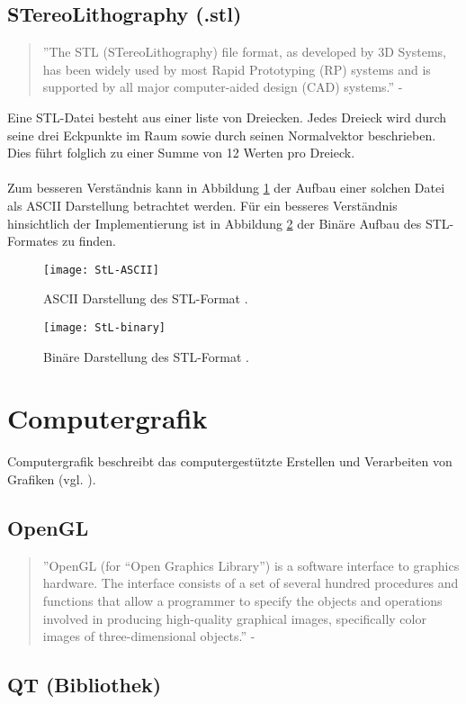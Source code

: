\subsection{STereoLithography (.stl)}
\begin{quote}
	''The STL (STereoLithography) file format, as developed by 3D Systems, has been widely used by most Rapid Prototyping (RP) systems and is supported by all major computer-aided design (CAD) systems.'' - \cite{STereoLithography}
\end{quote}
Eine STL-Datei besteht aus einer liste von Dreiecken. Jedes Dreieck wird durch seine drei Eckpunkte im Raum sowie durch seinen Normalvektor beschrieben. Dies führt folglich zu einer Summe von 12 Werten pro Dreieck.\\
\\
Zum besseren Verständnis kann in Abbildung \ref{fig:ASCIISTL} der Aufbau einer solchen Datei als ASCII Darstellung betrachtet werden. Für ein besseres Verständnis hinsichtlich der Implementierung ist in Abbildung \ref{fig:BINARYSTL} der Binäre Aufbau des STL-Formates zu finden. 

\begin{figure}
	\centering
	\texttt{[image: StL-ASCII]}
	\caption{ASCII Darstellung des STL-Format \cite{STLFormat}.}
	\label{fig:ASCIISTL}
\end{figure}

\begin{figure}
	\centering
	\texttt{[image: StL-binary]}
	\caption{Binäre Darstellung des STL-Format \cite{STLFormat}.}
	\label{fig:BINARYSTL}
\end{figure}

\section{Computergrafik}
Computergrafik beschreibt das computergestützte Erstellen und Verarbeiten von Grafiken (vgl. \cite{ComputerGraphics}). 
\subsection{OpenGL}
\begin{quote}
	''OpenGL (for “Open Graphics Library”) is a software interface to graphics hardware.
	The interface consists of a set of several hundred procedures and functions
	that allow a programmer to specify the objects and operations involved in producing
	high-quality graphical images, specifically color images of three-dimensional
	objects.'' - \cite{OpenGLDoku}
\end{quote}
\subsection{QT (Bibliothek)}